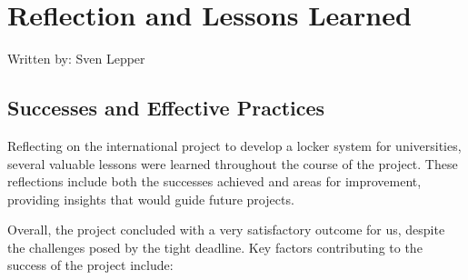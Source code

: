 \section{Reflection and Lessons Learned}
{\tiny Written by: Sven Lepper}\\

\subsection{Successes and Effective Practices}

Reflecting on the international project to develop a locker system for universities, several valuable lessons were learned throughout the course of the project. These reflections include both the successes achieved and areas for improvement, providing insights that would guide future projects.

Overall, the project concluded with a very satisfactory outcome for us, despite the challenges posed by the tight deadline. Key factors contributing to the success of the project include:

